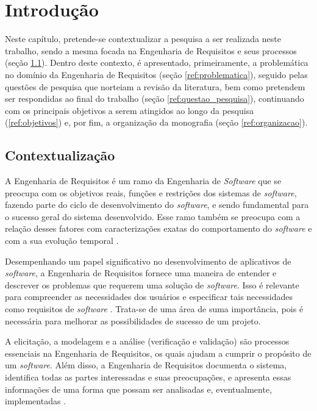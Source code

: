 \chapter[Introdução]{Introdução}

Neste capítulo, pretende-se contextualizar a pesquisa a ser realizada neste trabalho, sendo a mesma focada na Engenharia de Requisitos e seus processos (seção \ref{ref:contextualizacao}). Dentro deste contexto, é apresentado, primeiramente, a problemática no domínio da Engenharia de Requisitos (seção \ref{ref:problematica}), seguido pelas questões de pesquisa que norteiam a revisão da literatura, bem como pretendem ser respondidas ao final do trabalho (seção \ref{ref:questao_pesquisa}), continuando com os principais objetivos a serem atingidos ao longo da pesquisa (\ref{ref:objetivos}) e, por fim, a organização da monografia (seção \ref{ref:organizacao}).

\label{chap:intro}

\section{Contextualização}

\label{ref:contextualizacao}

A Engenharia de Requisitos é um ramo da Engenharia de \textit{Software} que se preocupa com os objetivos reais, funções e restrições dos sistemas de \textit{software}, fazendo parte do ciclo de desenvolvimento do \textit{software}, e sendo fundamental para o sucesso geral do sistema desenvolvido. Esse ramo também se preocupa com a relação desses fatores com caracterizações exatas do comportamento do \textit{software} e com a sua evolução temporal \cite{elliott2012software}.

Desempenhando um papel significativo no desenvolvimento de aplicativos de \textit{software}, a Engenharia de Requisitos fornece uma maneira de entender e descrever os problemas que requerem uma solução de \textit{software}. Isso é relevante para compreender as necessidades dos usuários e especificar tais necessidades como requisitos de \textit{software} \cite{elliott2012software}. Trata-se de uma área de suma importância, pois é necessária para melhorar as possibilidades de sucesso de um projeto.

A elicitação, a modelagem e a análise (verificação e validação) são processos essenciais na Engenharia de Requisitos, os quais ajudam a cumprir o propósito de um \textit{software}. Além disso, a Engenharia de Requisitos documenta o sistema, identifica todas as partes interessadas e suas preocupações, e apresenta essas informações de uma forma que possam ser analisadas e, eventualmente, implementadas \cite{elliott2012software}.

